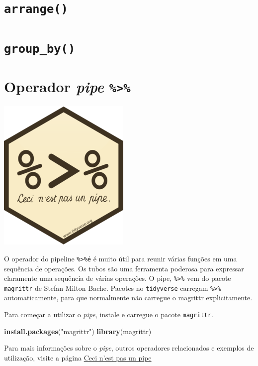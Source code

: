 \documentclass[]{book}
\newenvironment{Shaded}{\begin{snugshade}}{\end{snugshade}}
\newcommand{\KeywordTok}[1]{\textcolor[rgb]{0.13,0.29,0.53}{\textbf{#1}}}
\newcommand{\NormalTok}[1]{#1}
\newcommand{\StringTok}[1]{\textcolor[rgb]{0.31,0.60,0.02}{#1}}
\begin{document}
\hypertarget{arrange}{%
\section{\texorpdfstring{\texttt{arrange()}}{arrange()}}\label{arrange}}

\hypertarget{group_by}{%
\section{\texorpdfstring{\texttt{group\_by()}}{group\_by()}}\label{group_by}}

\hypertarget{operador-pipe}{%
\section{\texorpdfstring{Operador \emph{pipe} \texttt{\%\textgreater{}\%}}{Operador pipe \%\textgreater\%}}\label{operador-pipe}}

\begin{center}\includegraphics[width=0.25\linewidth]{imagens/magritt} \end{center}

O operador do pipeline \texttt{\%\textgreater{}\%é} é muito útil para reunir várias funções em uma sequência de operações. Os tubos são uma ferramenta poderosa para expressar claramente uma sequência de várias operações. O pipe, \texttt{\%\textgreater{}\%} vem do pacote \texttt{magrittr} de Stefan Milton Bache. Pacotes no \texttt{tidyverse} carregam \texttt{\%\textgreater{}\%} automaticamente, para que normalmente não carregue o magrittr explicitamente.

Para começar a utilizar o \emph{pipe}, instale e carregue o pacote \texttt{magrittr}.

\begin{Shaded}
\begin{Highlighting}[]
\KeywordTok{install.packages}\NormalTok{(}\StringTok{"magrittr"}\NormalTok{)}
\KeywordTok{library}\NormalTok{(magrittr)}
\end{Highlighting}
\end{Shaded}

Para mais informações sobre o \emph{pipe}, outros operadores relacionados e exemplos de utilização, visite a página \href{https://cran.r-project.org/web/packages/magrittr/vignettes/magrittr.html}{Ceci n'est pas un pipe}
\end{document}
